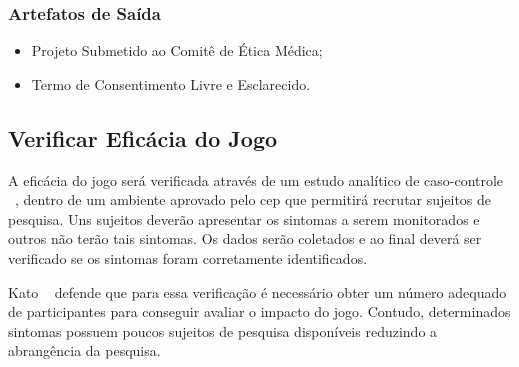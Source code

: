\subsubsection{Artefatos de Saída}
\begin{itemize}
	\item Projeto Submetido ao Comitê de Ética Médica;
	\item Termo de Consentimento Livre e Esclarecido.
\end{itemize}


 









\subsection{Verificar Eficácia do Jogo}
A eficácia do jogo será verificada através de um estudo analítico de caso-controle ~\cite{menezes2001epidemiologia}, dentro de um ambiente aprovado pelo \ac{cep} que permitirá recrutar sujeitos de pesquisa. Uns sujeitos deverão apresentar os sintomas a serem monitorados e outros não terão tais sintomas. Os dados serão coletados e ao final deverá ser verificado se os sintomas foram corretamente identificados.

Kato ~\cite{kato12} defende que para essa verificação é necessário obter um número adequado de participantes para conseguir avaliar o impacto do jogo. Contudo, determinados sintomas possuem poucos sujeitos de pesquisa disponíveis reduzindo a abrangência da pesquisa.


